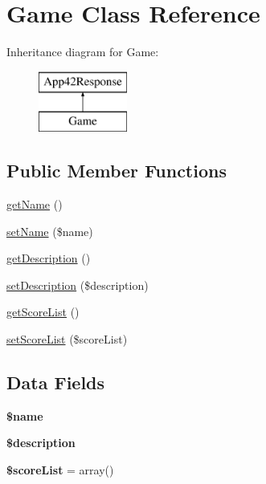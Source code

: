 \hypertarget{class_game}{\section{Game Class Reference}
\label{class_game}
}
Inheritance diagram for Game\+:\begin{figure}[H]
\begin{center}
\leavevmode
\includegraphics[height=2.000000cm]{class_game}
\end{center}
\end{figure}
\subsection*{Public Member Functions}
\begin{DoxyCompactItemize}
\item 
\hyperlink{class_game_a3d0963e68bb313b163a73f2803c64600}{get\+Name} ()
\item 
\hyperlink{class_game_a2fe666694997d047711d7653eca2f132}{set\+Name} (\$name)
\item 
\hyperlink{class_game_a2e7bb35c71bf1824456ceb944cb7a845}{get\+Description} ()
\item 
\hyperlink{class_game_a31fad3e39336ea079ea758e051866627}{set\+Description} (\$description)
\item 
\hyperlink{class_game_ae96c8b04491e6f65743ccba52ffd94fa}{get\+Score\+List} ()
\item 
\hyperlink{class_game_ab02988daf82502e7b607a37767a4bd5d}{set\+Score\+List} (\$score\+List)
\end{DoxyCompactItemize}
\subsection*{Data Fields}
\begin{DoxyCompactItemize}
\item 
\hypertarget{class_game_ab2fc40d43824ea3e1ce5d86dee0d763b}{{\bfseries \$name}}\label{class_game_ab2fc40d43824ea3e1ce5d86dee0d763b}

\item 
\hypertarget{class_game_a87b032cba06009e3467abf1c8018d960}{{\bfseries \$description}}\label{class_game_a87b032cba06009e3467abf1c8018d960}

\item 
\hypertarget{class_game_a767f94250b70cc1a1f92758d8eb7ce59}{{\bfseries \$score\+List} = array()}\label{class_game_a767f94250b70cc1a1f92758d8eb7ce59}

\end{DoxyCompactItemize}


